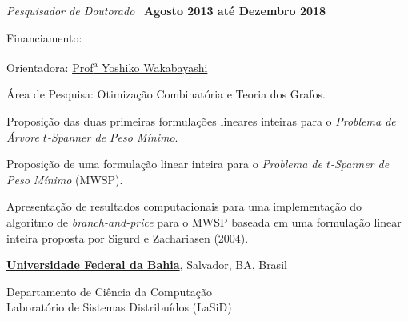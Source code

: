 \documentclass[10pt]{article}
\let\oldcite=\cite
\renewcommand{\cite}[1]{\footnotesize{\textbf{\oldcite{#1}}}\normalsize{}}
\newcommand{\halfblankline}{\quad\vspace{-0.5\baselineskip}\pagebreak[3]}
\begin{document}
\begin{outerlist}

\item[] \textit{Pesquisador de Doutorado}~\cite{Braga2017,Braga2018}%
  \hfill \textbf{Agosto 2013 até Dezembro 2018}
  \begin{innerlist}
    
  \item Financiamento:~\cite{Grant2014}
  \item Orientadora: \href{http://www.ime.usp.br/~yw}%
    {Prof\textsuperscript{a} Yoshiko Wakabayashi}
  \item Área de Pesquisa: Otimização Combinatória e Teoria dos Grafos.
  \item Proposição das duas primeiras formulações lineares inteiras para o \emph{Problema de Árvore $t$-Spanner de Peso Mínimo}.
  \item Proposição de uma formulação linear inteira para o \emph{Problema de $t$-Spanner de Peso Mínimo} (MWSP).
  \item Apresentação de resultados computacionais para uma implementação do algoritmo de \emph{branch-and-price} para o MWSP baseada em uma formulação linear inteira proposta por Sigurd e Zachariasen (2004).  

  \end{innerlist}

\end{outerlist}

\halfblankline

\href{http://www.ufba.br}{\textbf{Universidade Federal da Bahia}},
Salvador, BA, Brasil

\begin{innerlist}
  \item[]
    Departamento de Ciência da Computação\\
    Laboratório de Sistemas Distribuídos (LaSiD)
\end{innerlist}
\end{document}
